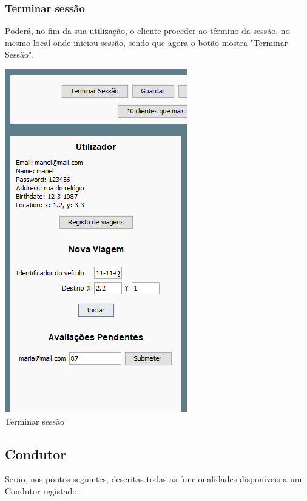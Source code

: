 \documentclass[a4paper]{article}
\begin{document}
\subsubsection{Terminar sessão}
Poderá, no fim da sua utilização, o cliente proceder ao término da sessão, no mesmo local onde iniciou sessão, sendo que agora o botão mostra "Terminar Sessão".
\begin{center}
  \includegraphics[scale=0.70]{terminarsessao}\\
  \caption{Terminar sessão}
  \label{fig:picture}
\end{center}

\subsection{Condutor}
Serão, nos pontos seguintes, descritas todas as funcionalidades disponíveis a um Condutor registado.
\end{document}
